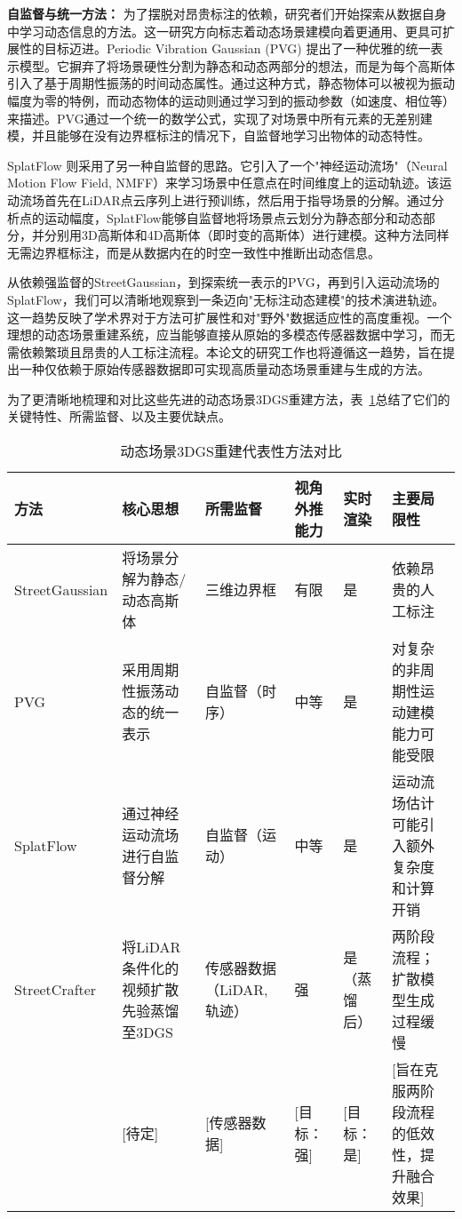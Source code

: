 \textbf{自监督与统一方法：} 为了摆脱对昂贵标注的依赖，研究者们开始探索从数据自身中学习动态信息的方法。这一研究方向标志着动态场景建模向着更通用、更具可扩展性的目标迈进。Periodic Vibration Gaussian (PVG) 提出了一种优雅的统一表示模型\cite{chen2023pvg}。它摒弃了将场景硬性分割为静态和动态两部分的想法，而是为每个高斯体引入了基于周期性振荡的时间动态属性。通过这种方式，静态物体可以被视为振动幅度为零的特例，而动态物体的运动则通过学习到的振动参数（如速度、相位等）来描述。PVG通过一个统一的数学公式，实现了对场景中所有元素的无差别建模，并且能够在没有边界框标注的情况下，自监督地学习出物体的动态特性\cite{chen2023pvg}。

SplatFlow 则采用了另一种自监督的思路\cite{sun2025splatflow}。它引入了一个"神经运动流场"（Neural Motion Flow Field, NMFF）来学习场景中任意点在时间维度上的运动轨迹。该运动流场首先在LiDAR点云序列上进行预训练，然后用于指导场景的分解。通过分析点的运动幅度，SplatFlow能够自监督地将场景点云划分为静态部分和动态部分，并分别用3D高斯体和4D高斯体（即时变的高斯体）进行建模。这种方法同样无需边界框标注，而是从数据内在的时空一致性中推断出动态信息\cite{sun2025splatflow}。

从依赖强监督的StreetGaussian，到探索统一表示的PVG，再到引入运动流场的SplatFlow，我们可以清晰地观察到一条迈向"无标注动态建模"的技术演进轨迹。这一趋势反映了学术界对于方法可扩展性和对"野外"数据适应性的高度重视。一个理想的动态场景重建系统，应当能够直接从原始的多模态传感器数据中学习，而无需依赖繁琐且昂贵的人工标注流程。本论文的研究工作也将遵循这一趋势，旨在提出一种仅依赖于原始传感器数据即可实现高质量动态场景重建与生成的方法。

为了更清晰地梳理和对比这些先进的动态场景3DGS重建方法，表~\ref{tab:dynamic-3dgs-comparison}总结了它们的关键特性、所需监督、以及主要优缺点。

\begin{table}
  \centering
  \caption{动态场景3DGS重建代表性方法对比}
  \label{tab:dynamic-3dgs-comparison}
  \begin{tabular}{p{2.5cm}p{3cm}p{2cm}p{1.5cm}p{1.5cm}p{3cm}}
    \toprule
    方法 & 核心思想 & 所需监督 & 视角外推能力 & 实时渲染 & 主要局限性 \\
    \midrule
    StreetGaussian\cite{yan2024street} & 将场景分解为静态/动态高斯体 & 三维边界框 & 有限 & 是 & 依赖昂贵的人工标注 \\
    PVG\cite{chen2023pvg} & 采用周期性振荡动态的统一表示 & 自监督（时序） & 中等 & 是 & 对复杂的非周期性运动建模能力可能受限 \\
    SplatFlow\cite{sun2025splatflow} & 通过神经运动流场进行自监督分解 & 自监督（运动） & 中等 & 是 & 运动流场估计可能引入额外复杂度和计算开销 \\
    StreetCrafter\cite{yan2025streetcrafter} & 将LiDAR条件化的视频扩散先验蒸馏至3DGS & 传感器数据（LiDAR, 轨迹） & 强 & 是（蒸馏后） & 两阶段流程；扩散模型生成过程缓慢 \\
    [本论文方法] & [待定] & [传感器数据] & [目标：强] & [目标：是] & [旨在克服两阶段流程的低效性，提升融合效果] \\
    \bottomrule
  \end{tabular}
\end{table}


